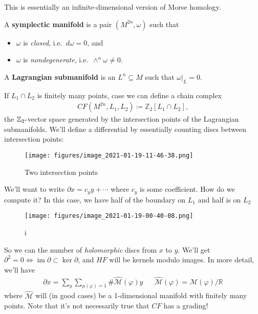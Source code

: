 This is essentially an infinite-dimensional version of Morse homology.

\begin{definition}

A \textbf{symplectic manifold} is a pair \((M^{2n}, \omega)\) such that

\begin{itemize}
\tightlist
\item
  \(\omega\) is \emph{closed}, i.e.~\(d \omega = 0\), and
\item
  \(\omega\) is \emph{nondegenerate}, i.e.~\(\wedge^n \omega \neq 0\).
\end{itemize}

\end{definition}

\begin{definition}[Lagrangian]

A \textbf{Lagrangian submanifold} is an \(L^n \subseteq M\) such that
\({ \left.{{\omega}} \right|_{{L}} } = 0\).

\end{definition}

If \(L_1 \cap L_2\) is finitely many points, case we can define a chain
complex
\begin{align*}
CF(M^{2n}, L_1, L_2) \coloneqq{\mathbb{Z}}_2[L_1 \cap L_2]
,\end{align*}
the \({\mathbb{Z}}_2{\hbox{-}}\)vector space generated by the
intersection points of the Lagrangian submanifolds. We'll define a
differential by essentially counting discs between intersection points:

\begin{figure}
\centering
\texttt{[image: figures/image\_2021-01-19-11-46-38.png]}
\caption{Two intersection points}
\end{figure}

We'll want to write \({{\partial}}x = c_y y + \cdots\) where \(c_y\) is
some coefficient. How do we compute it? In this case, we have half of
the boundary on \(L_1\) and half is on \(L_2\)

\begin{figure}
\centering
\texttt{[image: figures/image\_2021-01-19-00-40-08.png]}
\caption{i}
\end{figure}

So we can the number of \emph{holomorphic} discs from \(x\) to \(y\).
We'll get
\({\partial}^2 = 0 \iff \operatorname{im}{\partial}\subset \ker {\partial}\),
and \(HF\) will be kernels modulo images. In more detail, we'll have
\begin{align*}
{{\partial}}x = \sum_y \sum_{\mu(\varphi) = 1} \# \widehat{\mathcal{M}} (\varphi)y &&  \widehat{\mathcal{M}}(\varphi) = \mathcal{M}(\varphi) / {\mathbb{R}}
\end{align*}
where \(\widehat{\mathcal{M}}\) will (in good cases) be a 1-dimensional
manifold with finitely many points. Note that it's not necessarily true
that \(CF\) has a grading!

